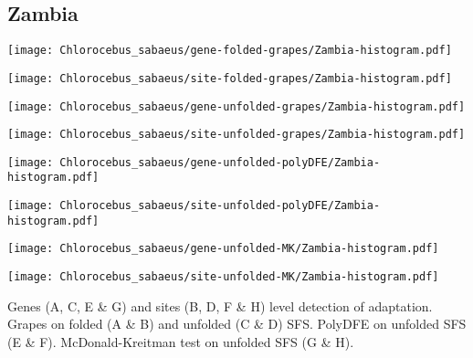 \documentclass{article}
\begin{document}
\pagebreak
\subsection{Zambia}
\centering
\begin{minipage}{0.49\linewidth}
    \texttt{[image: Chlorocebus\_sabaeus/gene-folded-grapes/Zambia-histogram.pdf]}
\end{minipage}%
\hfill
\begin{minipage}{0.49\linewidth}
    \texttt{[image: Chlorocebus\_sabaeus/site-folded-grapes/Zambia-histogram.pdf]}
\end{minipage}
\hfill
\begin{minipage}{0.49\linewidth}
    \texttt{[image: Chlorocebus\_sabaeus/gene-unfolded-grapes/Zambia-histogram.pdf]}
\end{minipage}%
\hfill
\begin{minipage}{0.49\linewidth}
    \texttt{[image: Chlorocebus\_sabaeus/site-unfolded-grapes/Zambia-histogram.pdf]}
\end{minipage}
\hfill
\begin{minipage}{0.49\linewidth}
    \texttt{[image: Chlorocebus\_sabaeus/gene-unfolded-polyDFE/Zambia-histogram.pdf]}
\end{minipage}%
\hfill
\begin{minipage}{0.49\linewidth}
    \texttt{[image: Chlorocebus\_sabaeus/site-unfolded-polyDFE/Zambia-histogram.pdf]}
\end{minipage}
\hfill
\begin{minipage}{0.49\linewidth}
    \texttt{[image: Chlorocebus\_sabaeus/gene-unfolded-MK/Zambia-histogram.pdf]}
\end{minipage}%
\hfill
\begin{minipage}{0.49\linewidth}
    \texttt{[image: Chlorocebus\_sabaeus/site-unfolded-MK/Zambia-histogram.pdf]}
\end{minipage}
\hfill
\flushleft
Genes (A, C, E \& G) and sites (B, D, F \& H) level detection of adaptation.
Grapes on folded (A \& B) and unfolded (C \& D) SFS.
PolyDFE on unfolded SFS (E \& F).
McDonald-Kreitman test on unfolded SFS (G \& H).
\end{document}
